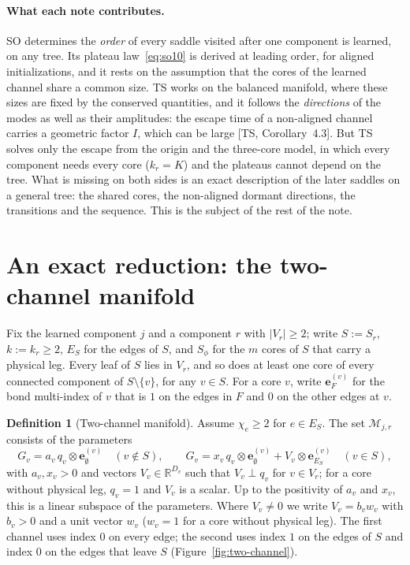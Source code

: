 \documentclass[11pt]{article}
\newcommand{\R}{\mathbb{R}}
\newcommand{\TS}{\textsf{TS}}
\newcommand{\SO}{\textsf{SO}}
\newcommand{\ts}[1]{[\TS, #1]}
\theoremstyle{definition}
\newtheorem{definition}[theorem]{Definition}
\numberwithin{equation}{section}
\begin{document}
\paragraph{What each note contributes.} \SO{} determines the \emph{order} of every saddle visited after one component is learned, on any tree. Its plateau law~\eqref{eq:so10} is derived at leading order, for aligned initializations, and it rests on the assumption that the cores of the learned channel share a common size. \TS{} works on the balanced manifold, where these sizes are fixed by the conserved quantities, and it follows the \emph{directions} of the modes as well as their amplitudes: the escape time of a non-aligned channel carries a geometric factor $I$, which can be large \ts{Corollary~4.3}. But \TS{} solves only the escape from the origin and the three-core model, in which every component needs every core ($k_r=K$) and the plateaus cannot depend on the tree. What is missing on both sides is an exact description of the later saddles on a general tree: the shared cores, the non-aligned dormant directions, the transitions and the sequence. This is the subject of the rest of the note.

\section{An exact reduction: the two-channel manifold}\label{sec:two-channel}

Fix the learned component $j$ and a component $r$ with $|V_r|\ge2$; write $S:=S_r$, $k:=k_r\ge2$, $E_S$ for the edges of $S$, and $S_\phi$ for the $m$ cores of $S$ that carry a physical leg. Every leaf of $S$ lies in $V_r$, and so does at least one core of every connected component of $S\setminus\{v\}$, for any $v\in S$. For a core $v$, write $\mathbf e^{(v)}_F$ for the bond multi-index of $v$ that is $1$ on the edges in $F$ and $0$ on the other edges at $v$.

\begin{definition}[Two-channel manifold]\label{def:two-channel}
Assume $\chi_e\ge2$ for $e\in E_S$. The set $\mathcal M_{j,r}$ consists of the parameters
\begin{equation}\label{eq:ansatz}
G_v=a_v\,q_v\otimes\mathbf e^{(v)}_\emptyset\quad(v\notin S),\qquad G_v=x_v\,q_v\otimes\mathbf e^{(v)}_\emptyset+V_v\otimes\mathbf e^{(v)}_{E_S}\quad(v\in S),
\end{equation}
with $a_v,x_v>0$ and vectors $V_v\in\R^{D_v}$ such that $V_v\perp q_v$ for $v\in V_r$; for a core without physical leg, $q_v=1$ and $V_v$ is a scalar. Up to the positivity of $a_v$ and $x_v$, this is a linear subspace of the parameters. Where $V_v\neq0$ we write $V_v=b_vw_v$ with $b_v>0$ and a unit vector $w_v$ ($w_v=1$ for a core without physical leg). The first channel uses index $0$ on every edge; the second uses index $1$ on the edges of $S$ and index $0$ on the edges that leave $S$ (Figure~\ref{fig:two-channel}).
\end{definition}
\end{document}
